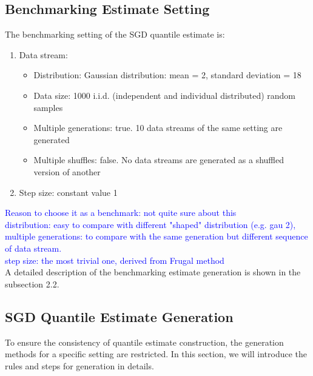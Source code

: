 \documentclass[12pt]{article}
\begin{document}
\subsection{Benchmarking Estimate Setting}
The benchmarking setting of the SGD quantile estimate is:
    \begin{enumerate}
        \item Data stream:
            \begin{itemize}
                \item Distribution: Gaussian distribution: mean = 2, standard deviation = 18
                \item Data size: 1000 i.i.d. (independent and individual distributed) random samples
                \item Multiple generations: true. 10 data streams of the same setting are generated
                \item Multiple shuffles: false. No data streams are generated as a shuffled version of another
            \end{itemize}
        \item Step size: constant value 1
    \end{enumerate}
\textcolor{blue}{
Reason to choose it as a benchmark: not quite sure about this
\\    
distribution: easy to compare with different "shaped" distribution (e.g. gau 2), 
\\
multiple generations: to compare with the same generation but different sequence of data stream. 
\\
step size: the most trivial one, derived from Frugal method}
\\
A detailed description of the benchmarking estimate generation is shown in the subsection 2.2.

\subsection{SGD Quantile Estimate Generation}
To ensure the consistency of quantile estimate construction, the generation methods for a specific setting are restricted.
In this section, we will introduce the rules and steps for generation in details.
\end{document}

